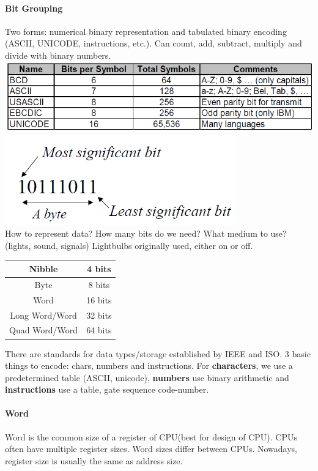 \documentclass[12 pt]{article}
\begin{document}
	\paragraph{Bit Grouping}
	Two forms: numerical binary representation and tabulated binary encoding (ASCII, UNICODE, instructions, etc.). Can count, add, subtract, multiply and divide with binary numbers. \includegraphics[scale=0.4]{asc.png} \includegraphics[scale=0.5]{bsg}\\
	How to represent data? How many bits do we need? What medium to use? (lights, sound, signals) Lightbulbs originally used, either on or off. \begin{tabular}{|c|c|}
		\hline Nibble & 4 bits \\ \hline Byte & 8 bits \\ \hline Word & 16 bits \\ \hline Long Word/Word & 32 bits \\ \hline Quad Word/Word & 64 bits \\ \hline
	\end{tabular} There are standards for data types/storage established by IEEE and ISO. 3 basic things to encode: chars, numbers and instructions. For \textbf{characters}, we use a predetermined table (ASCII, unicode), \textbf{numbers} use binary arithmetic and \textbf{instructions} use a table, gate sequence code-number.
	\paragraph{Word}
	Word is the common size of a register of CPU(best for design of CPU). CPUs often have multiple register sizes. Word sizes differ between CPUs. Nowadays, register size is usually the same as address size.
\end{document}
